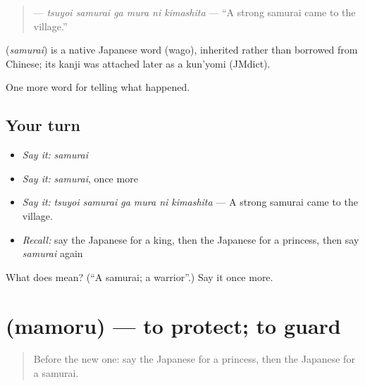 \begin{quote}
\textbf{   } — \emph{tsuyoi samurai ga mura ni kimashita} — \textquotedblleft{}A strong samurai came to the village.\textquotedblright{}
\end{quote}

\begin{cousinweb}
\textbf{} (\emph{samurai}) is a native Japanese word (wago), inherited rather than borrowed from Chinese; its kanji was attached later as a kun'yomi (JMdict).
\end{cousinweb}

\begin{grammarlens}[title={What you've built}]
One more word for telling what happened.
\end{grammarlens}

\subsection*{Your turn}
\begin{itemize}
\raggedright
  \item \emph{Say it:} \emph{samurai}
  \item \emph{Say it:} \emph{samurai}, once more
  \item \emph{Say it:} \emph{tsuyoi samurai ga mura ni kimashita} — A strong samurai came to the village.
  \item \emph{Recall:} say the Japanese for a king, then the Japanese for a princess, then say \emph{samurai} again
\end{itemize}

\begin{tcolorbox}[breakable,colback=teal!4,colframe=teal!35!black,title={Before you move on}]
What does  mean? (\textquotedblleft{}A samurai; a warrior\textquotedblright{}.) Say it once more.
\end{tcolorbox}
\section[\texorpdfstring{\ja{まもる} (mamoru)}{まもる (mamoru)}]{ (mamoru) — to protect; to guard}

\label{lesson:JA-C299-mamoru}



\begin{quote}
Before the new one: say the Japanese for a princess, then the Japanese for a samurai.
\end{quote}

